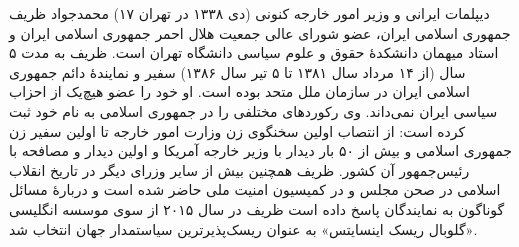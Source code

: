 %
%
محمدجواد ظریف (‎۱۷ دی ۱۳۳۸ در تهران) دیپلمات ایرانی و وزیر امور خارجه
کنونی جمهوری اسلامی ایران، عضو شورای عالی جمعیت هلال احمر جمهوری
اسلامی ایران و استاد میهمان دانشکدهٔ حقوق و علوم سیاسی دانشگاه تهران
است. ظریف به مدت ۵ سال (از ۱۴ مرداد سال ۱۳۸۱ تا ۵ تیر سال ۱۳۸۶)
سفیر و نمایندهٔ دائم جمهوری اسلامی ایران در سازمان ملل متحد
بوده است. او خود را عضو هیچ‌یک از احزاب سیاسی ایران نمی‌داند. وی
رکوردهای مختلفی را در جمهوری اسلامی به نام خود ثبت کرده است: از انتصاب
اولین سخنگوی زن وزارت امور خارجه تا اولین سفیر زن جمهوری اسلامی و بیش
از ۵۰ بار دیدار با وزیر خارجه آمریکا و اولین دیدار و مصافحه با
رئیس‌جمهور آن کشور. ظریف همچنین بیش از سایر وزرای دیگر در تاریخ
انقلاب اسلامی در صحن مجلس و در کمیسیون امنیت ملی حاضر شده است و
دربارهٔ مسائل گوناگون به نمایندگان پاسخ داده است  ظریف در سال ۲۰۱۵
از سوی موسسه انگلیسی «گلوبال ریسک اینسایتس» به عنوان ریسک‌پذیرترین
سیاستمدار جهان انتخاب شد.

